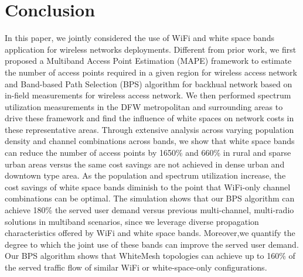 \section{Conclusion}
\label{sec:conclusion}
In this paper, we jointly considered the use of WiFi and white space bands application
for wireless networks deployments. 
Different from prior work, we first proposed a Multiband 
Access Point Estimation (MAPE) framework to estimate the number of access points required in 
a given region for wireless access network and Band-based Path Selection (BPS) algorithm for
backhual network based on in-field measurements for wireless access network. 
We then performed spectrum utilization measurements in the DFW metropolitan and surrounding areas 
to drive these framework and find the influence of white spaces on network costs in these representative areas. 
%
Through extensive analysis across varying population density and channel combinations across bands, 
we show that white space bands can reduce the number of access points by 1650\%
and 660\% in rural and sparse urban areas versus the same cost savings are not achieved in dense urban 
and downtown type area. As the population and spectrum utilization increase, the cost savings of 
white space bands diminish to the point that WiFi-only channel combinations can be optimal.
The simulation shows that our BPS algorithm can achieve 180\% the served user demand versus previous 
multi-channel, multi-radio solutions in multiband scenarios, since we leverage diverse propagation 
characteristics offered by WiFi and white space bands. Moreover,we quantify the degree to which the joint 
use of these bands can improve the served user demand. Our BPS algorithm shows that WhiteMesh topologies 
can achieve up to 160\% of the served traffic flow of similar WiFi or white-space-only configurations.


